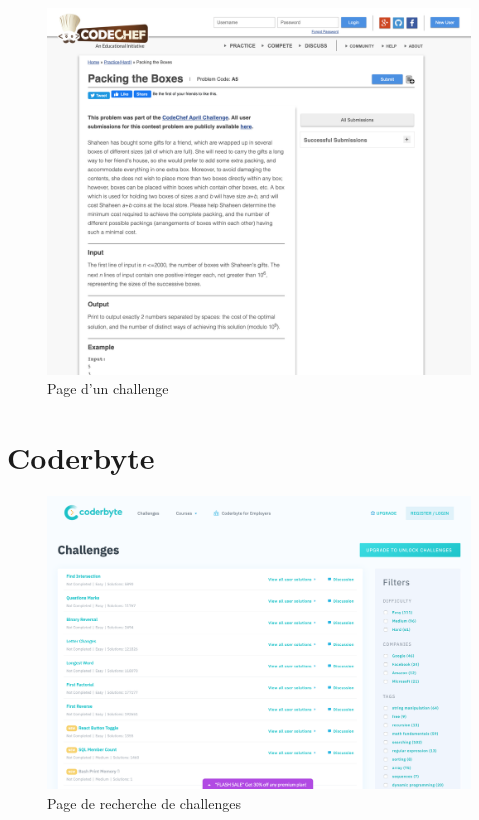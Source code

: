 \begin{figure}[H]
    \includegraphics[width=\textwidth,height=0.45\textheight,keepaspectratio]{images/comparison/codechef-3.png}
    \centering
    \caption[Codechef : page d'un challenge]{Page d'un challenge}
\end{figure}

\section{Coderbyte}

\begin{figure}[H]
    \includegraphics[width=\textwidth,height=0.5\textheight,keepaspectratio]{images/comparison/coderbyte-1.png}
    \centering
    \caption[Coderbyte : page de recherche de challenges]{Page de recherche de challenges}
\end{figure}

